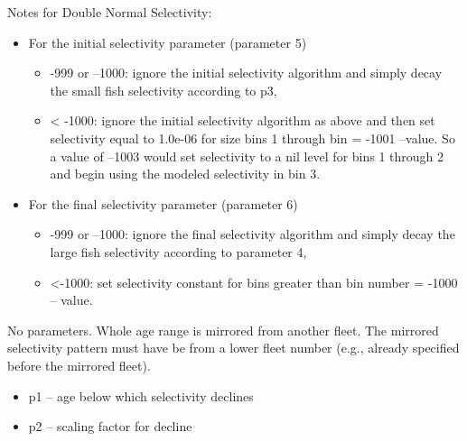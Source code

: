 Notes for Double Normal Selectivity:
	\begin{itemize}
		\item For the initial selectivity parameter (parameter 5)
		\begin{itemize}
			\item -999 or –1000:   ignore the initial selectivity algorithm and simply decay the small fish selectivity according to p3,
			\item < -1000:  ignore the initial selectivity algorithm as above and then set selectivity equal to 1.0e-06 for size bins 1 through bin =  -1001 –value.  So a value of –1003 would set selectivity to a nil level for bins 1 through 2 and begin using the modeled selectivity in bin 3.
		\end{itemize}
		\item For the final selectivity parameter (parameter 6)
		\begin{itemize}
			\item -999 or –1000:   ignore the final selectivity algorithm and simply decay the large fish selectivity according to parameter 4,
			\item <-1000:  set selectivity constant for bins greater than bin number =  -1000 – value.
		\end{itemize}
	\end{itemize}


No parameters.  Whole age range is mirrored from another fleet. The mirrored selectivity pattern must have be from a lower fleet number (e.g., already specified before the mirrored fleet).

	\begin{itemize}
		\item p1 – age below which selectivity declines
		\item p2 – scaling factor for decline
	\end{itemize}


